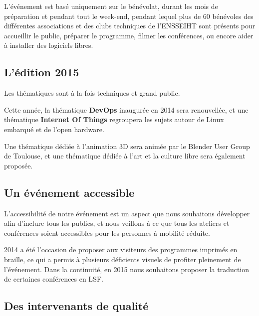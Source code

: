 \Separateur

L'événement est basé uniquement sur le bénévolat, durant les mois 
de préparation et pendant tout le week-end, pendant lequel plus de 60 
bénévoles des différentes associations et des clubs techniques de l'ENSSEIHT
sont présents pour accueillir le public, préparer le 
programme, filmer les conférences, ou encore aider à installer des 
logiciels libres.

\subsection{L'édition 2015}

Les thématiques sont à la fois techniques et grand 
public. 

Cette année, la thématique \textbf{DevOps} inaugurée en 2014 sera 
renouvellée, et une thématique \textbf{Internet Of Things} regroupera 
les sujets autour de Linux embarqué et de l'open hardware.

Une thématique dédiée à l'animation 3D sera animée par 
le Blender User Group de Toulouse, et une thématique dédiée à l'art 
et la culture libre sera également proposée.

\subsection{Un événement accessible}

\begin{minipage}{0.38\textwidth}
\begin{center}
\end{center}
\end{minipage}
\begin{minipage}{0.62\textwidth}
L'accessibilité de notre événement est un aspect que nous souhaitons 
développer afin d'inclure tous les publics, et nous veillons à ce que 
tous les ateliers et conférences soient accessibles pour les personnes 
à mobilité réduite.

2014 a été l'occasion de proposer aux visiteurs des programmes 
imprimés en braille, ce qui a permis à plusieurs déficients visuels 
de profiter pleinement de l'événement. Dans la continuité, en 2015 
nous souhaitons proposer la traduction de certaines conférences en LSF.
\end{minipage}

\newpage

\subsection{Des intervenants de qualité}

